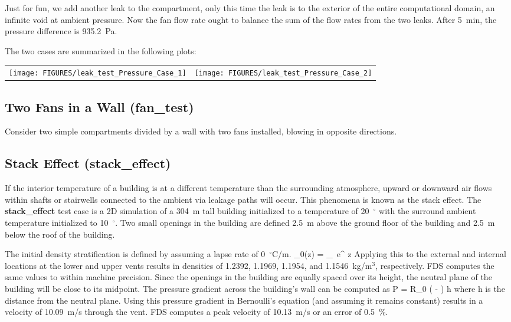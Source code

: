 \documentclass[11pt]{book}
\begin{document}
Just for fun, we add another leak to the compartment, only this time the leak is to the exterior of the entire computational domain, an infinite void at ambient pressure.
Now the fan flow rate ought to balance the sum of the flow rates from the two leaks. After 5~min, the pressure difference is 935.2~Pa.

The two cases are summarized in the following plots:

\vspace{0.1in}
\noindent
\begin{tabular*}{\textwidth}{lr}
\texttt{[image: FIGURES/leak\_test\_Pressure\_Case\_1]} &
\texttt{[image: FIGURES/leak\_test\_Pressure\_Case\_2]}
\end{tabular*}

\clearpage


\subsection{Two Fans in a Wall ({\bf fan\_test})  }

Consider two simple compartments divided by a wall with two fans installed, blowing in opposite directions.



\clearpage

\subsection{Stack Effect ({\bf stack\_effect})  }

If the interior temperature of a building is at a different temperature than the surrounding atmosphere, upward or
downward air flows within shafts or stairwells connected to the ambient via leakage paths will occur.  This
phenomena is known as the stack effect.  The {\bf stack\_effect} test case is a 2D simulation of a 304~m tall building
initialized to a temperature of 20~$^\circ$ with the surround ambient temperature initialized to 10~$^\circ$.
Two small openings in the building are defined 2.5~m above the ground floor of the building and 2.5~m below the
roof of the building.

The initial density stratification is defined by assuming a lapse rate of 0~$^\circ$C/m.
\be
   \rho_0(z) = \rho_\infty \, e^{  z}
\ee
Applying this to the external and internal locations at the lower and upper vents results in densities of 1.2392,
1.1969, 1.1954, and 1.1546~kg/m$^3$, respectively.  FDS computes the same values to within machine precision.  Since the
openings in the building are equally spaced over its height, the neutral plane of the building will be close to its midpoint.
The pressure gradient across the building's wall can be computed as
\be
   \delta P =  {R_{0}} \left(  -  \right) h
\ee
where h is the distance from the neutral plane.  Using this pressure gradient in Bernoulli's equation (and assuming it remains constant)
results in a velocity of 10.09~m/s through the vent.  FDS computes a peak velocity of 10.13~m/s or an error of 0.5~\%.
\end{document}
